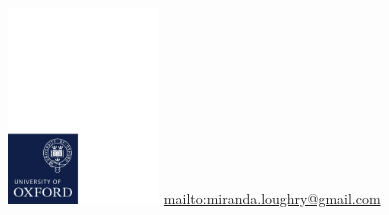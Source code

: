 \documentclass{beamer}
\begin{document}
\begin{frame}
	\begin{center}
		\vspace{1cm}
		\includegraphics[width=0.3\textwidth,trim=0 0 117mm 183mm,clip]{graphics/ox_brand_cmyk_pos.pdf}
		\vfill
		\url{mailto:miranda.loughry@gmail.com}
	\end{center}
\end{frame}
\end{document}
